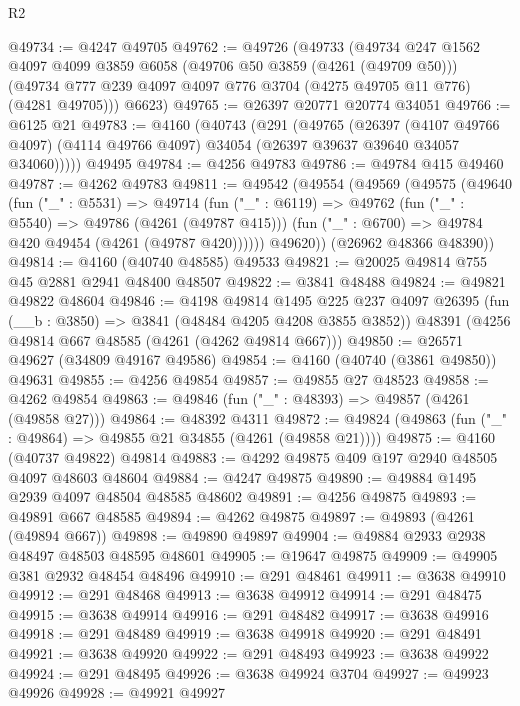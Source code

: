 \begin{lexlean}{R2}
\begin{coremodule}
@49734 := @4247 @49705
@49762 := @49726
    (@49733
      (@49734
        @247
        @1562
        @4097
        @4099
        @3859
        @6058
        (@49706 @50 @3859 (@4261 (@49709 @50)))
        (@49734 @777 @239 @4097 @4097 @776 @3704 (@4275 @49705 @11 @776) (@4281 @49705)))
      @6623)
@49765 := @26397 @20771 @20774 @34051
@49766 := @6125 @21
@49783 := @4160
    (@40743
      (@291
        (@49765
          (@26397
            (@4107 @49766 @4097)
            (@4114 @49766 @4097)
            @34054
            (@26397 @39637 @39640 @34057 @34060)))))
    @49495
@49784 := @4256 @49783
@49786 := @49784 @415 @49460
@49787 := @4262 @49783
@49811 := @49542
    (@49554
      (@49569
        (@49575
          (@49640
            (fun ("_" : @5531) =>
            @49714
              (fun ("_" : @6119) =>
              @49762
                (fun ("_" : @5540) => @49786 (@4261 (@49787 @415)))
                (fun ("_" : @6700) => @49784 @420 @49454 (@4261 (@49787 @420))))))
          @49620))
      (@26962 @48366 @48390))
@49814 := @4160 (@40740 @48585) @49533
@49821 := @20025 @49814 @755 @45 @2881 @2941 @48400 @48507
@49822 := @3841 @48488
@49824 := @49821 @49822 @48604
@49846 := @4198
    @49814
    @1495
    @225
    @237
    @4097
    @26395
    (fun (__b : @3850) => @3841 (@48484 @4205 @4208 @3855 @3852))
    @48391
    (@4256 @49814 @667 @48585 (@4261 (@4262 @49814 @667)))
@49850 := @26571 @49627 (@34809 @49167 @49586)
@49854 := @4160 (@40740 (@3861 @49850)) @49631
@49855 := @4256 @49854
@49857 := @49855 @27 @48523
@49858 := @4262 @49854
@49863 := @49846 (fun ("_" : @48393) => @49857 (@4261 (@49858 @27)))
@49864 := @48392 @4311
@49872 := @49824 (@49863 (fun ("_" : @49864) => @49855 @21 @34855 (@4261 (@49858 @21))))
@49875 := @4160 (@40737 @49822) @49814
@49883 := @4292 @49875 @409 @197 @2940 @48505 @4097 @48603 @48604
@49884 := @4247 @49875
@49890 := @49884 @1495 @2939 @4097 @48504 @48585 @48602
@49891 := @4256 @49875
@49893 := @49891 @667 @48585
@49894 := @4262 @49875
@49897 := @49893 (@4261 (@49894 @667))
@49898 := @49890 @49897
@49904 := @49884 @2933 @2938 @48497 @48503 @48595 @48601
@49905 := @19647 @49875
@49909 := @49905 @381 @2932 @48454 @48496
@49910 := @291 @48461
@49911 := @3638 @49910
@49912 := @291 @48468
@49913 := @3638 @49912
@49914 := @291 @48475
@49915 := @3638 @49914
@49916 := @291 @48482
@49917 := @3638 @49916
@49918 := @291 @48489
@49919 := @3638 @49918
@49920 := @291 @48491
@49921 := @3638 @49920
@49922 := @291 @48493
@49923 := @3638 @49922
@49924 := @291 @48495
@49926 := @3638 @49924 @3704
@49927 := @49923 @49926
@49928 := @49921 @49927

\end{coremodule}
\end{lexlean}
